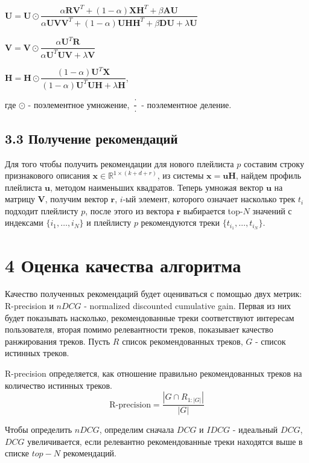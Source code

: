 \documentclass[12pt,twoside]{article}
\begin{document}
$\mathbf{U} = \mathbf{U} \odot \dfrac{\alpha\mathbf{R}\mathbf{V}^T + (1 -\alpha)\mathbf{X}\mathbf{H}^T + \beta\mathbf{AU}}{\alpha\mathbf{UV}\mathbf{V}^T + (1 - \alpha)\mathbf{UH}\mathbf{H}^T + \beta\mathbf{DU} + \lambda\mathbf{U}}$

$\mathbf{V} = \mathbf{V} \odot \dfrac{\alpha\mathbf{U}^T\mathbf{R}}{\alpha\mathbf{U}^T\mathbf{UV} + \lambda\mathbf{V}}$

$\mathbf{H} = \mathbf{H} \odot \dfrac{(1 - \alpha)\mathbf{U}^T\mathbf{X}}{(1 - \alpha)\mathbf{U}^T\mathbf{UH} + \lambda\mathbf{H}}$,

где $\odot$ - поэлементное умножение, $\dfrac{\cdot}{\cdot}$ - поэлементное деление. 

\subsection{3.3 Получение рекомендаций}

Для того чтобы получить рекомендации для нового плейлиста $p$ составим строку признакового описания $\mathbf{x} \in \mathbb{R}^{1 \times  (k + d + r)}$, из системы $\mathbf{x} = \mathbf{u}\mathbf{H}$, найдем профиль плейлиста $\mathbf{u}$, методом наименьших квадратов. Теперь умножая вектор $\mathbf{u}$ на матрицу $\mathbf{V}$, получим вектор $\mathbf{r}$, $i$-ый элемент, которого означает насколько трек $t_i$ подходит плейлисту  $p$, после этого из вектора $\mathbf{r}$ выбирается top-$N$ значений с индексами $\{i_1, \ldots, i_N\}$ и плейлисту $p$ рекомендуются треки $\{t_{i_1}, \ldots, t_{i_N}\}$.

\section{4 Оценка качества алгоритма}

Качество полученных рекомендаций будет оцениваться с помощью двух метрик: \\R-precision и $nDCG$ - normalized discounted cumulative gain. Первая из них будет показывать насколько, рекомендованные треки соответствуют интересам пользователя, вторая помимо релевантности треков, показывает качество ранжирования треков. Пусть $R$ список рекомендованных треков, $G$ - список истинных треков.

R-precision определяется, как отношение правильно рекомендованных треков на количество истинных треков.
$$\text{R-precision} = \frac{|G \cap R_{1:|G|}|}{|G|}$$

Чтобы определить $nDCG$, определим сначала $DCG$ и $IDCG$ - идеальный $DCG$, $DCG$ увеличивается, если релевантно рекомендованные треки находятся выше в списке $top-N$ рекомендаций.
\end{document}
